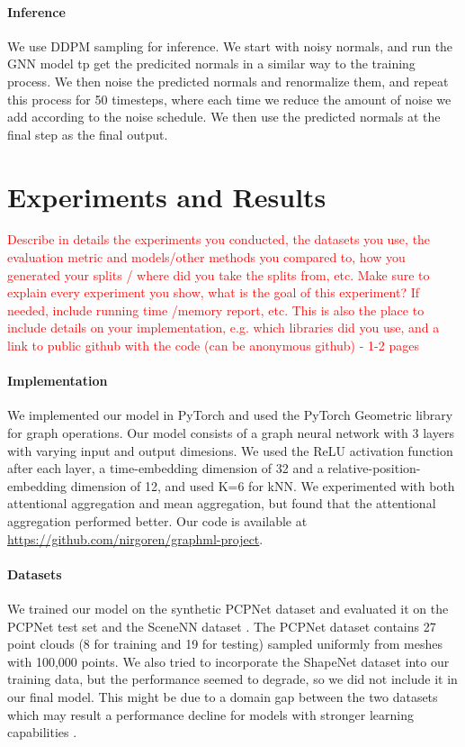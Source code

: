 \documentclass{acmart}
\begin{document}
\paragraph{Inference}
We use DDPM sampling for inference. We start with noisy normals, and run the GNN model tp get the predicited normals in a similar way to the training process. We then noise the predicted normals and renormalize them, and repeat this process for 50 timesteps, where each time we reduce the amount of noise we add according to the noise schedule. We then use the predicted normals at the final step as the final output.

\section{Experiments and Results}
\textcolor{red}{Describe in details the experiments you conducted, the datasets you use, the evaluation metric and models/other methods you compared to, how you generated your splits / where did you take the splits from, etc. Make sure to explain every experiment you show, what is the goal of this experiment? If needed, include running time /memory report, etc.
This is also the place to include details on your implementation, e.g. which libraries did you use, and a link to public github with the code (can be anonymous github) - 1-2 pages}

\paragraph{Implementation}
We implemented our model in PyTorch and used the PyTorch Geometric library for graph operations. Our model consists of a graph neural network with 3 layers with varying input and output dimesions. We used the ReLU activation function after each layer, a time-embedding dimension of 32 and a relative-position-embedding dimension of 12, and used K=6 for kNN. We experimented with both attentional aggregation and mean aggregation, but found that the attentional aggregation performed better. Our code is available at \url{https://github.com/nirgoren/graphml-project}.

\paragraph{Datasets}
We trained our model on the synthetic PCPNet dataset \cite{guerrero2018pcpnet} and evaluated it on the PCPNet test set and the SceneNN dataset \cite{scenenn-3dv16}. The PCPNet dataset contains 27 point clouds (8 for training and 19 for testing) sampled uniformly from meshes with 100,000 points. We also tried to incorporate the ShapeNet dataset \cite{chang2015shapenet} into our training data, but the performance seemed to degrade, so we did not include it in our final model. This might be due to a domain gap between the two datasets which may result a performance decline for models with stronger learning capabilities \cite{arXiv:2406.09681}.
\end{document}
